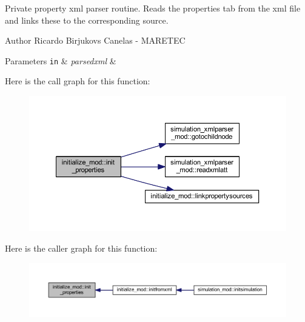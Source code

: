 Private property xml parser routine. Reads the properties tab from the xml file and links these to the corresponding source. 

\begin{DoxyAuthor}{Author}
Ricardo Birjukovs Canelas -\/ M\+A\+R\+E\+T\+EC 
\end{DoxyAuthor}

\begin{DoxyParams}[1]{Parameters}
\mbox{\tt in}  & {\em parsedxml} & \\
\hline
\end{DoxyParams}
Here is the call graph for this function\+:\nopagebreak
\begin{figure}[H]
\begin{center}
\leavevmode
\includegraphics[width=350pt]{namespaceinitialize__mod_a4c7a93dca8bb7b573e91f877033ab22a_cgraph}
\end{center}
\end{figure}
Here is the caller graph for this function\+:\nopagebreak
\begin{figure}[H]
\begin{center}
\leavevmode
\includegraphics[width=350pt]{namespaceinitialize__mod_a4c7a93dca8bb7b573e91f877033ab22a_icgraph}
\end{center}
\end{figure}
\mbox{\label{namespaceinitialize__mod_a18736cca205403067232125b8e510ab2}} 
